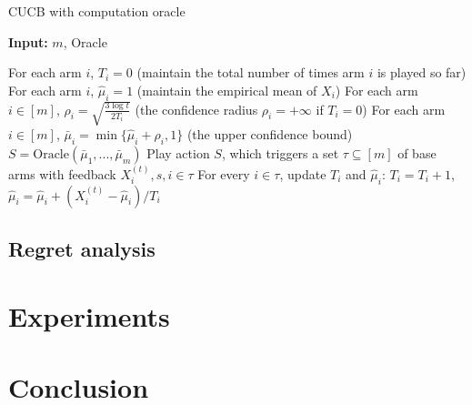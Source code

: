 \documentclass[a4paper,10pt]{article}
\begin{document}
\begin{algorithm}
\caption{CUCB with computation oracle}\label{alg:cucb}
\hspace*{\algorithmicindent} \textbf{Input: } $m$, Oracle
\begin{algorithmic}[1]
\State For each arm $i$, $T_i = 0$ (maintain the total number of times arm $i$ is played so far)
\State For each arm $i$, $\hat{\mu}_i = 1$ (maintain the empirical mean of $X_i$)
\State For each arm $i\in[m]$, $\rho_i = \sqrt{\frac{3\log t}{2T_i}}$ (the confidence radius $\rho_i = +\infty$ if $T_i = 0$)
\State For each arm $i\in[m]$, $\bar{\mu}_i = \min\{\hat{\mu}_i + \rho_i, 1\}$ (the upper confidence bound)
\State $S = \text{Oracle}(\bar{\mu}_1, ..., \bar{\mu}_m)$
\State Play action $S$, which triggers a set $\tau \subseteq[m]$ of base arms with feedback $X_i^{(t)}, s, i\in\tau$
\State For every $i\in\tau$, update $T_i$ and $\hat{\mu}_i$: $T_i = T_i+1$, $\hat{\mu}_i = \hat{\mu}_i + (X_i^{(t)} - \hat{\mu}_i) / T_i$
\EndFor
\end{algorithmic}
\end{algorithm}

\subsection{Regret analysis}

\section{Experiments}

\section{Conclusion}
\end{document}
